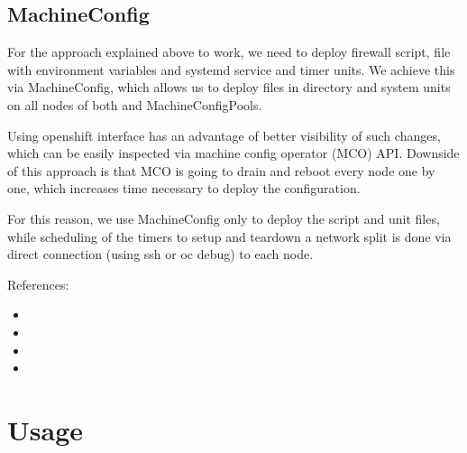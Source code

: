 \documentclass[letterpaper,10pt,english]{sphinxmanual}
\begin{document}
\section{MachineConfig}
\label{\detokenize{overview:machineconfig}}
For the approach explained above to work, we need to deploy firewall script,
file with  environment variables and systemd service and timer
units. We achieve this via MachineConfig, which allows us to deploy files in
 directory and system units on all nodes of both  and
 MachineConfigPools.

Using openshift interface has an advantage of better visibility of such
changes, which can be easily inspected via machine config operator (MCO) API.
Downside of this approach is that MCO is going to drain and reboot every node
one by one, which increases time necessary to deploy the configuration.

For this reason, we use MachineConfig only to deploy the script and unit files,
while scheduling of the timers to setup and teardown a network split is done
via direct connection (using ssh or oc debug) to each node.

References:
\begin{itemize}
\item {} 

\item {} 

\item {} 

\item {} 

\end{itemize}


\chapter{Usage}
\label{\detokenize{usage:usage}}\label{\detokenize{usage:id1}}\label{\detokenize{usage::doc}}
\end{document}
